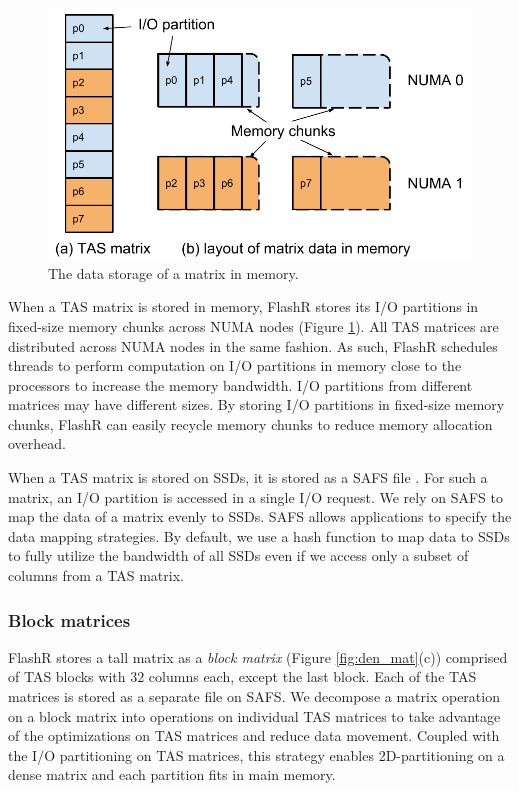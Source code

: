 \begin{figure}
	\centering
	\includegraphics[scale=0.4]{FlashMatrix_figs/matrix_mem.pdf}
	\caption{The data storage of a matrix in memory.}
	\label{fig:mem_store}
  \vspace{-12pt}
\end{figure}

When a TAS matrix is stored in memory, FlashR stores its I/O partitions in
fixed-size memory chunks across NUMA nodes (Figure \ref{fig:mem_store}).
All TAS matrices are distributed across NUMA nodes in the same fashion. 
As such, FlashR schedules threads to perform computation on I/O partitions
in memory close to the processors to increase the memory bandwidth.
I/O partitions from
different matrices may have different sizes. By storing I/O partitions in
fixed-size memory chunks, FlashR can easily recycle memory chunks to reduce
memory allocation overhead.

When a TAS matrix is stored on SSDs, it is stored as a SAFS file \cite{safs}.
For such a matrix, an I/O partition is accessed in a single I/O request.
We rely on SAFS to map the data of a matrix evenly to SSDs. SAFS allows
applications to specify the data mapping strategies. By default, we use
a hash function to map data to SSDs to fully utilize the bandwidth of all SSDs
even if we access only a subset of columns from a TAS matrix.

\subsubsection{Block matrices} \label{sec:block_mat}
FlashR stores a tall matrix as a \textit{block matrix} 
(Figure \ref{fig:den_mat}(c)) comprised of TAS blocks with $32$ columns each,
except the last block. 
Each of the TAS matrices is stored as a separate file on SAFS. 
We decompose a matrix operation
on a block matrix into operations on individual TAS matrices to take advantage
of the optimizations on TAS matrices and reduce data movement.
Coupled with the I/O partitioning on TAS matrices, this strategy enables
2D-partitioning on a dense matrix and each partition fits in main memory.

